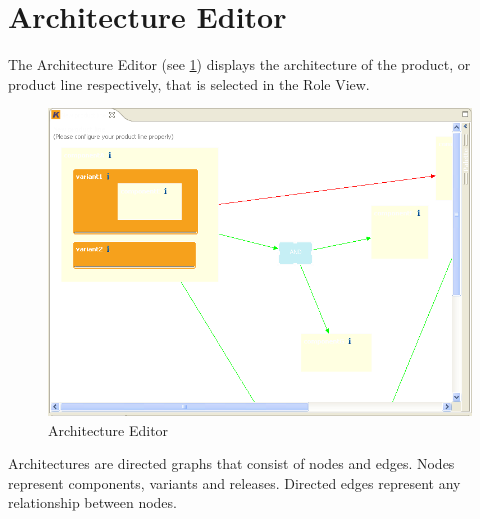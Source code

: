 \section{Architecture Editor}

The Architecture Editor (see \ref{architecture}) displays the architecture of the product,
or product line respectively, that is selected in the Role View. \par

\begin{figure}[h!]
\begin{center}
\includegraphics[width=15cm]{architecture.png}
   \caption{Architecture Editor}
\label{architecture}
\end{center}
\end{figure}\par

Architectures are directed graphs that consist of nodes and edges. 
Nodes represent components, variants and releases. Directed edges represent
any relationship between nodes.\par

